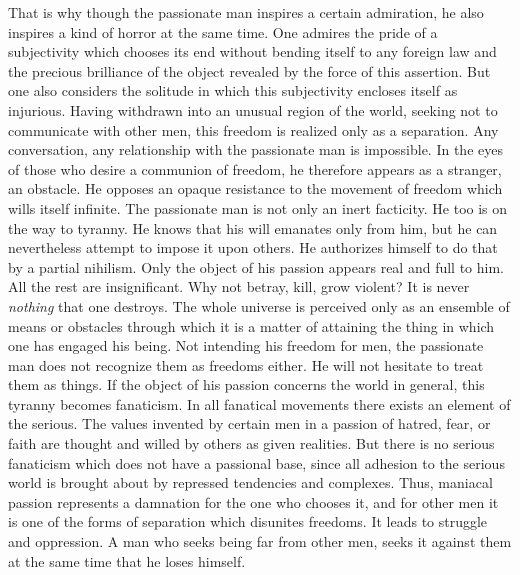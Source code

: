 \documentclass[11pt]{article}
\begin{document}
That is why though the passionate man inspires a certain admiration, he also inspires a kind of horror at the same time. One admires the pride of a subjectivity which chooses its end without bending itself to any foreign law and the precious brilliance of the object revealed by the force of this assertion. But one also considers the solitude in which this subjectivity encloses itself as injurious. Having withdrawn into an unusual region of the world, seeking not to communicate with other men, this freedom is realized only as a separation. Any conversation, any relationship with the passionate man is impossible. In the eyes of those who desire a communion of freedom, he therefore appears as a stranger, an obstacle. He opposes an opaque resistance to the movement of freedom which wills itself infinite. The passionate man is not only an inert facticity. He too is on the way to tyranny. He knows that his will emanates only from him, but he can nevertheless attempt to impose it upon others. He authorizes himself to do that by a partial nihilism. Only the object of his passion appears real and full to him. All the rest are insignificant. Why not betray, kill, grow violent? It is never \textit{nothing} that one destroys. The whole universe is perceived only as an ensemble of means or obstacles through which it is a matter of attaining the thing in which one has engaged his being. Not intending his freedom for men, the passionate man does not recognize them as freedoms either. He will not hesitate to treat them as things. If the object of his passion concerns the world in general, this tyranny becomes fanaticism. In all fanatical movements there exists an element of the serious. The values invented by certain men in a passion of hatred, fear, or faith are thought and willed by others as given realities. But there is no serious fanaticism which does not have a passional base, since all adhesion to the serious world is brought about by repressed tendencies and complexes. Thus, maniacal passion represents a damnation for the one who chooses it, and for other men it is one of the forms of separation which disunites freedoms. It leads to struggle and oppression. A man who seeks being far from other men, seeks it against them at the same time that he loses himself.
\end{document}
